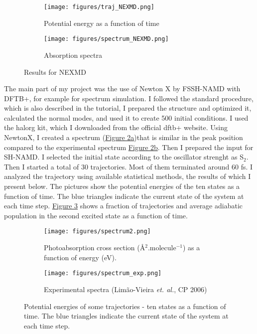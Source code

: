 \documentclass{article}
\begin{document}
\begin{figure}[h!]
    \centering
\begin{subfigure}{.45\textwidth}
    \texttt{[image: figures/traj\_NEXMD.png]}   
    \caption{Potential energy as a function of time}
\end{subfigure}
\begin{subfigure}{.45\textwidth}
    \texttt{[image: figures/spectrum\_NEXMD.png]}   
    \caption{Absorption spectra}
\end{subfigure}
\label{nexmd}
\caption{Results for NEXMD}
\end{figure}
\vspace{.4cm}
The main part of my project was the use of Newton X by FSSH-NAMD with DFTB+, for example for spectrum simulation. I followed the standard procedure, which is also described in the tutorial, I prepared the structure and optimized it, calculated the normal modes, and used it to create 500 initial conditions. I used the halorg kit, which I downloaded from the official dftb+ website. Using NewtonX, I created a spectrum (\hyperref[spec]{Figure 2a})that is similar in the peak position compared to the experimental spectrum \hyperref[spec]{Figure 2b}. Then I prepared the input for SH-NAMD. I selected the initial state according to the oscillator strenght as S$_2$. Then I started a total of 30 trajectories. Most of them terminated around 60 fs. I analyzed the trajectory using available statistical methods, the results of which I present below. The pictures show the potential energies of the ten states as a function of time. The blue triangles indicate the current state of the system at each time step. \hyperref[sps]{Figure 3} shows a fraction of trajectories and average adiabatic population in the second excited state as a function of time.\vspace{.4cm}

\begin{figure}[h!]
    \centering
\begin{subfigure}{.42\textwidth}
    \texttt{[image: figures/spectrum2.png]}   
    \caption{Photoabsorption cross section (Å$^2$.molecule$^{-1}$) as a function of energy (eV).}
\end{subfigure}
\begin{subfigure}{.42\textwidth}
    \texttt{[image: figures/spectrum\_exp.png]}   
    \caption{Experimental spectra \tiny{(Limão-Vieira \textit{et. al.}, CP 2006)}}
\end{subfigure}
\label{spec}
\caption{Potential energies of some trajectories - ten states as a function of time. The blue triangles indicate the current state of the system at each time step.}
\end{figure}
\end{document}
